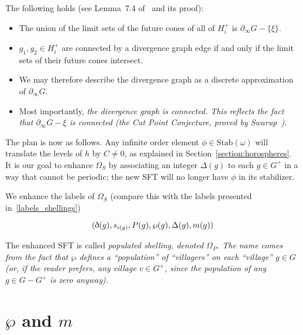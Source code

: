 \documentclass[12pt,reqno]{amsart}
\theoremstyle{plain}
\theoremstyle{definition}
\numberwithin{subcase}{case}
\theoremstyle{plain}
\theoremstyle{definition}
\def\stab[#1]{\mathrm{Stab}(#1)}
\begin{document}
The following holds (see Lemma~7.4  of~\cite{cohen_goodman-strauss_rieck_2021} and its proof):
\begin{itemize}
\item The union of the limit sets of the future cones of all of \(H^{+}_{i}\) is \(\partial_{\infty} G - \{\xi\}\).

\item \(g_{1}, g_{2} \in H^{+}_{i}\) are connected by a divergence graph edge if and only if the limit sets of their future cones intersect.

\item We may therefore describe the divergence graph as a discrete approximation of \(\partial_{\infty} G\).

\item Most importantly, \em the divergence graph is connected\em. This reflects the fact that \(\partial_{\infty} G - \xi\) is connected (the Cut Point Conjecture, proved by Swarup~\cite{MR1412948}). 
\end{itemize}

The plan is now as follows. Any infinite order element \(\phi \in \stab[\omega]\) will translate the levels of \(h\) by \(C \neq 0\), as explained in Section~\ref{section:horospheres}. It is our goal to enhance \(\Omega_{S}\) by associating an integer \(\Delta(g)\) to each \(g \in G^{+}\) in a way that cannot be periodic; the new SFT will no longer have \(\phi\) in its stabilizer.

We enhance the labels of \(\Omega_{S}\) (compare this with the labels presented in~\eqref{labels_shellings})

\begin{equation}
\label{labels_populated_shellings}
(\textrm{\dh}(g) ,s_{i(g)},P(g),\wp(g),\Delta(g),m(g))
\end{equation}

The enhanced SFT is called \em populated shelling\em, denoted \(\Omega_{P}\). The name comes from the fact that \(\wp\) defines a ``population'' of ``villagers'' on each ``village'' \(g \in G\) (or, if the reader prefers, any village \(v \in G^{+}\), since the population of any \(g \in G - G^{+}\) is zero anyway).










\section{\(\wp\) and \(m\)}
\label{section:PandM}
\end{document}
